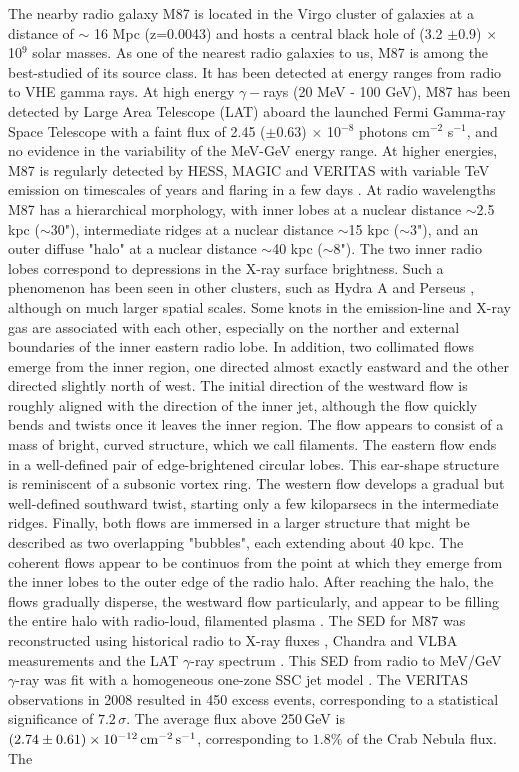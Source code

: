 \documentclass[preprint, twocolumn,secnumarabic,amssymb, nobibnotes, aps, prd]{revtex4-1}
\begin{document}
The nearby radio galaxy M87 is located in the Virgo cluster of galaxies at a distance of $\sim$ 16 Mpc (z=0.0043) and hosts a central black hole of (3.2 $\pm$0.9) $\times$ 10$^9$ solar masses.  As one of the nearest radio galaxies to us, M87  is among the best-studied of its source class. It has been detected at energy ranges from radio to VHE gamma rays.  At high energy $\gamma-$rays  (20 MeV - 100 GeV), M87 has been  detected by Large Area Telescope (LAT) aboard the launched Fermi Gamma-ray Space Telescope \cite{2009ApJ...707...55A} with a faint flux of 2.45 ($\pm0.63$)  $\times$ 10$^{-8}$ photons cm$^{-2}$ s$^{-1}$, and  no evidence in the  variability of the MeV-GeV energy range. At higher energies, M87 is regularly detected by HESS, MAGIC and VERITAS with variable TeV emission  on timescales of years and flaring in a few days \cite{2012ApJ...746..151A, 2010ApJ...716..819A, 2006Sci...314.1424A}. At radio wavelengths M87 has a hierarchical morphology, with inner lobes at a nuclear distance $\sim$2.5 kpc ($\sim$30"), intermediate ridges at a nuclear distance  $\sim$15 kpc ($\sim$3"), and an outer diffuse  "halo" at a nuclear distance $\sim$40 kpc ($\sim$8").   The two inner radio lobes correspond to depressions in the X-ray surface brightness. Such a phenomenon has been seen in other clusters, such as Hydra A \cite{mcn00} and  Perseus \cite{fab00}, although on much larger spatial scales.  Some knots in the emission-line and X-ray gas are associated with each other, especially on the norther and external boundaries of the inner eastern radio lobe.  In addition, two collimated flows emerge from the inner region, one directed almost exactly eastward and the other directed slightly north of west. The initial direction of the westward flow is roughly aligned with the direction of the inner jet, although the flow quickly bends and twists once it leaves the inner region.  The flow appears to consist of a mass of bright, curved structure, which we call filaments.  The eastern flow ends in a well-defined pair of edge-brightened circular lobes.  This ear-shape  structure is reminiscent of a subsonic vortex ring.  The western flow develops a gradual but well-defined southward twist, starting only a few kiloparsecs in the intermediate ridges. Finally, both flows are immersed in a larger structure that might be described as two overlapping "bubbles", each extending about 40 kpc.  The coherent flows appear to be continuos from the point at which they emerge from the inner lobes to the outer edge of the radio halo.  After reaching the halo, the flows gradually disperse, the westward flow particularly, and appear to be filling the entire halo with radio-loud, filamented plasma \cite{you02}. The  SED  for M87 was reconstructed using historical radio to X-ray fluxes  \citep{spa96, tan08}, Chandra and VLBA measurements \citep{bir91, des96} and the  LAT $\gamma$-ray spectrum \citep{2009ApJ...707...55A}. This SED from radio to MeV/GeV $\gamma$-ray was fit with a homogeneous one-zone SSC jet model \citep{fin08}. The VERITAS observations in 2008 resulted in 450 excess events, corresponding to a statistical significance of $7.2\,\sigma$.  The average flux above 250\,GeV is $(2.74 \pm 0.61) \times 10^{-12} \rm{\,cm}^{-2} \rm{\,s}^{-1}$, corresponding to $1.8\%$ of the Crab Nebula flux.  The 
\end{document}
